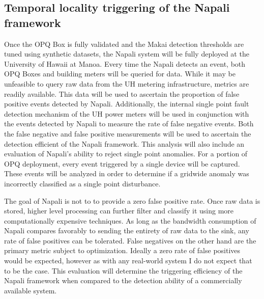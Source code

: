\subsection{Temporal locality triggering of the Napali framework} \label{iexp:sec:loc}
Once the OPQ Box is fully validated and the Makai detection thresholds are tuned using synthetic datasets, the Napali system will be fully deployed at the University of Hawaii at Manoa.  Every time the Napali detects an event, both OPQ Boxes and building meters will be queried for data. While it may be unfeasible to query raw data from the UH metering infrastructure, metrics are readily available. This data will be used to ascertain the proportion of false positive events detected by Napali. Additionally, the internal single point fault detection mechanism of the UH power meters will be used in conjunction with the events detected by Napali to measure the rate of false negative events. Both the false negative and false positive measurements will be used to ascertain the detection efficient of the Napali framework. This analysis will also include an evaluation  of Napali's ability to reject single point anomalies. For a portion of OPQ deployment, every event triggered by a single device will be captured. These events will be analyzed in order to determine if a gridwide anomaly was incorrectly classified as a single point disturbance. 

The goal of Napali is not to to provide a zero false positive rate. Once raw data is stored, higher level processing can further filter and classify it using more computationally expensive techniques. As long as the bandwidth consumption of Napali compares favorably to sending the entirety of raw data to the sink, any rate of false positives can be tolerated. False negatives on the other hand are the primary metric subject to optimization. Ideally a zero rate of false positives would be expected, however as with any real-world system I do not expect that to be the case. This evaluation will determine the triggering efficiency of the Napali framework when compared to the detection ability of a commercially available system.

